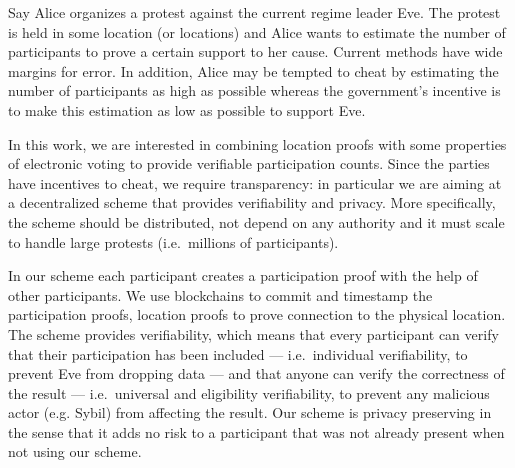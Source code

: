 Say Alice organizes a protest against the current regime leader Eve.
The protest is held in some location (or locations) and Alice wants to estimate 
the number of participants to prove a certain support to her cause.
Current methods have wide margins for error.
In addition, Alice may be tempted to cheat by estimating the number of 
participants as high as possible whereas the government's incentive is to make 
this estimation as low as possible to support Eve.
                                                                                  
In this work, we are interested in combining location proofs with some 
properties of electronic voting to provide verifiable participation counts.
Since the parties have incentives to cheat, we require transparency: in 
particular we are aiming at a decentralized scheme that provides verifiability 
and privacy.
More specifically, the scheme should be distributed, not depend on any authority 
and it must scale to handle large protests (i.e.\ millions of participants).

In our scheme each participant creates a participation proof with the help of 
other participants.
We use blockchains to commit and timestamp the participation proofs, location 
proofs to prove connection to the physical location.
The scheme provides verifiability, which means that every participant can verify 
that their participation has been included --- i.e.\ individual verifiability, 
to prevent Eve from dropping data --- and that anyone can verify the correctness 
of the result --- i.e.\ universal and eligibility verifiability, to prevent any 
malicious actor (e.g. Sybil) from affecting the result.
Our scheme is privacy preserving in the sense that it adds no risk to a 
participant that was not already present when not using our scheme.

